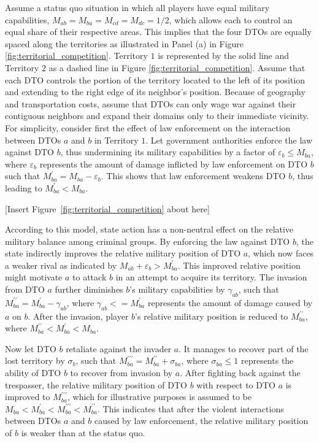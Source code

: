 \documentclass[12pt,letterpaper]{article}
\begin{document}
Assume a status quo situation in which all players have equal military capabilities, $M_{ab}=M_{ba}=M_{cd}=M_{dc}=1/2$, which allows each to control an equal share of their respective areas. This implies that the four DTOs are equally spaced along the territories as illustrated in Panel (a) in Figure \ref{fig:territorial_competition}. Territory $1$ is represented by the solid line and Territory $2$ as a dashed line in Figure \ref{fig:territorial_competition}. Assume that each DTO controls the portion of the territory located to the left of its position and extending to the right edge of its neighbor's position. Because of geography and transportation costs, assume that DTOs can only wage war against their contiguous neighbors and expand their domains only to their immediate vicinity. For simplicity, consider first the effect of law enforcement on the interaction between DTOs $a$ and $b$ in Territory $1$. Let government authorities enforce the law against DTO $b$, thus undermining its military capabilities by a factor of $\varepsilon_{b} \le M_{ba}$, where $\varepsilon_{b}$ represents the amount of damage inflicted by law enforcement on DTO $b$ such that $M^{\prime}_{ba}=M_{ba}-\varepsilon_{b}$. This shows that law enforcement weakens DTO $b$, thus leading to $M^{\prime}_{ba}<M_{ba}$.

\begin{center}
   [Insert Figure~\ref{fig:territorial_competition} about here]
\end{center}


According to this model, state action has a non-neutral effect on the relative military balance among criminal groups. By enforcing the law against DTO $b$, the state indirectly improves the relative military position of DTO $a$, which now faces a weaker rival as indicated by $M_{ab}+\varepsilon_{b}>M^{\prime}_{ba}$. This improved relative position might motivate $a$ to attack $b$ in an attempt to acquire its territory. The invasion from DTO $a$ further diminishes $b$'s military capabilities by $\gamma_{ab}$, such that $M^{\prime \prime}_{ba}=M^{\prime}_{ba}-\gamma_{ab}$, where $\gamma_{ab}<=M^{\prime}_{ba}$ represents the amount of damage caused by $a$ on $b$. After the invasion, player $b$'s relative military position is reduced to $M^{\prime \prime}_{ba}$, where $M^{\prime \prime}_{ba}<M^{\prime}_{ba}<M_{ba}$. 

Now let DTO $b$ retaliate against the invader $a$. It manages to recover part of the lost territory by $\sigma_{b}$, such that  $M^{\prime \prime \prime}_{ba}=M^{\prime \prime}_{ba}+\sigma_{ba}$, where $\sigma_{ba}\le 1$ represents the ability of DTO $b$ to recover from invasion by $a$. After fighting back against the trespasser, the relative military position of DTO $b$ with respect to DTO $a$ is improved to $M^{\prime \prime \prime}_{ba}$, which for illustrative purposes is assumed to be  $M_{ba} < M^{\prime}_{ba} < M^{\prime \prime \prime}_{ba}<M^{\prime \prime}_{ba}$. This indicates that after the violent interactions between DTOs $a$ and $b$ caused by law enforcement, the relative military position of $b$ is weaker than at the status quo.  
\end{document}
